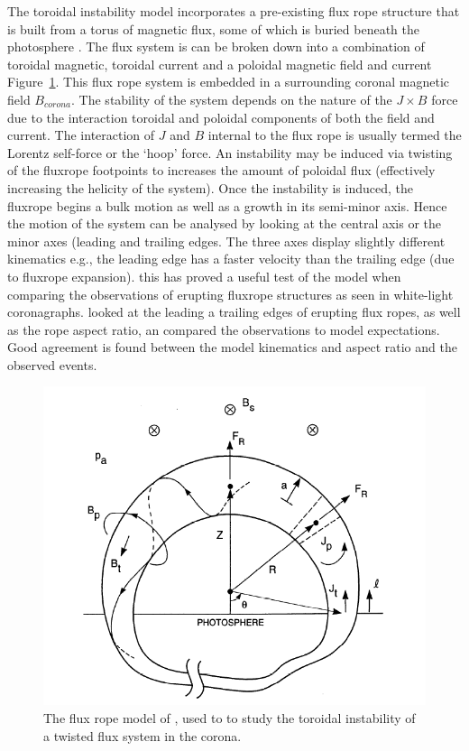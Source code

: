The toroidal instability model incorporates a pre-existing flux rope structure that is built from a torus of magnetic flux, some of which is buried beneath the photosphere \citep{chen1989}. The flux system is can be broken down into a combination of toroidal magnetic, toroidal current and a poloidal magnetic field and current Figure~\ref{fig:chen_model}. This flux rope system is embedded in a surrounding coronal magnetic field $B_{corona}$. The stability of the system depends on the nature of the $J \times B$ force due to the interaction toroidal and poloidal components of both the field and current. The interaction of $J$ and $B$ internal to the flux rope is usually termed the Lorentz self-force or the \textquoteleft hoop' force. An instability may be induced via twisting of the fluxrope footpoints to increases the amount of poloidal flux (effectively increasing the helicity of the system). Once the instability is induced, the fluxrope begins a bulk motion as well as a growth in its semi-minor axis. Hence the motion of the system can be analysed by looking at the central axis or the minor axes (leading and trailing edges. The three axes display slightly different kinematics e.g., the leading edge has a faster velocity than the trailing edge (due to fluxrope expansion). this has proved a useful test of the model when comparing the observations of erupting fluxrope structures as seen in white-light coronagraphs. \citet{krall2001} looked at the leading a trailing edges of erupting flux ropes, as well as the rope aspect ratio, an compared the observations to model expectations. Good agreement is found between the model kinematics and aspect ratio and the observed events.
\begin{figure}[!t]
\begin{center}
\includegraphics[scale=0.5]{images/chen_model}
\caption{The flux rope model of \citet{chen1989}, used to to study the toroidal instability of a twisted flux system in the corona.}
\label{fig:chen_model}
\end{center}
\end{figure}

